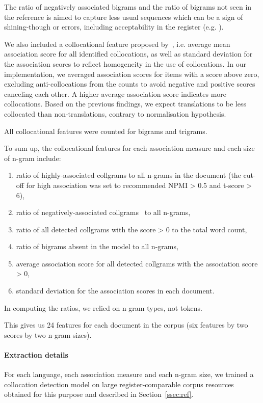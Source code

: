 The ratio of negatively associated bigrams and the ratio of bigrams not seen in the reference is aimed to capture less usual sequences which can be a sign of shining-though or errors, including acceptability in the register (e.g. ).

We also included a collocational feature proposed by~\citet{Volansky2011}, i.e. average mean association score for all identified collocations, as well as standard deviation for the association scores to reflect homogeneity in the use of collocations. In our implementation, we averaged association scores for items with a score above zero, excluding anti-collocations from the counts to avoid negative and positive scores canceling each other. A higher average association score indicates more collocations. 
Based on the previous findings, we expect translations to be less collocated than non-translations, contrary to normalisation hypothesis.  

All collocational features were counted for bigrams and trigrams.

To sum up, the collocational features for each association measure and each size of n-gram include: 

\label{pg:collgrams}
\begin{enumerate}\compresslist{}
	\item ratio of highly-associated collgrams to all n-grams in the document (the cut-off for high association was set to recommended \gls{NPMI} > 0.5 and t-score > 6),
	\item ratio of negatively-associated collgrams~\cite[anti-collocations,][]{Evert2009} to all n-grams,
	\item ratio of all detected collgrams with the score > 0 to the total word count,
	\item ratio of bigrams absent in the model to all n-grams,
	\item average association score for all detected collgrams with the association score > 0,
	\item standard deviation for the association scores in each document.
\end{enumerate}

In computing the ratios, we relied on n-gram types, not tokens. 

This gives us 24 features for each document in the corpus (six features by two scores by two n-gram sizes).

\paragraph{Extraction details} For each language, each association measure and each n-gram size, we trained a collocation detection model on large register-comparable corpus resources obtained for this purpose and described in Section~\ref{ssec:ref}.

